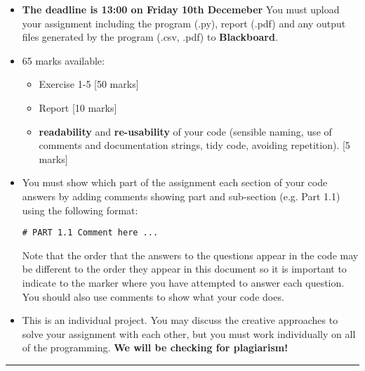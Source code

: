 \documentclass[11pt]{report}
\begin{document}
\begin{itemize}
	
 	\item \textbf{The \textbf{deadline is 13:00 on Friday 10th Decemeber}} You must upload your assignment including the program (.py), report (.pdf) and any output files generated by the program (.csv, .pdf) to \textbf{Blackboard}.
	\item 65 marks available:
	\begin{itemize}
		\item Exercise 1-5 [50 marks]
    	\item Report [10 marks]
    	\item \textbf{readability} and \textbf{re-usability} of your code (sensible naming, use of comments and documentation strings, tidy code, avoiding repetition). [5 marks]
	\end{itemize}
	\item You must show which part of the assignment each section of your code answers by adding comments showing part and sub-section (e.g. Part 1.1) using the following format:

    \vspace{0.5em}
    {\tt \#\ PART 1.1 Comment here ...}
    \vspace{0.5em}
    
    Note that the order that the answers to the questions appear in the code may be different to the order they appear in this document so it is important to indicate to the marker where you have attempted to answer each question. You should also use comments to show what your code does. 
    \item This is an individual project. You may discuss the creative approaches to solve your assignment with each other, but you must work individually on all of the programming. 
    	\textbf{We will be checking for plagiarism!}
    \end{itemize}
    
\vspace{1em}
\hrule
\vspace{1em}
    
\end{document}
